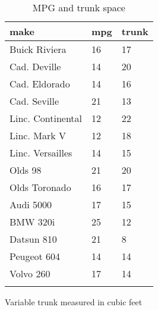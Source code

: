 \documentclass{article}
\begin{document}
\begin{table}[tbp] \centering
{}

\caption{MPG and trunk space}
\begin{tabularx}{\linewidth}{@{}lCC@{}}

\toprule
{make}&{mpg}&{trunk} \tabularnewline
\midrule \addlinespace[\belowrulesep]
Buick Riviera&16&17 \tabularnewline
Cad. Deville&14&20 \tabularnewline
Cad. Eldorado&14&16 \tabularnewline
Cad. Seville&21&13 \tabularnewline
Linc. Continental&12&22 \tabularnewline
Linc. Mark V&12&18 \tabularnewline
Linc. Versailles&14&15 \tabularnewline
Olds 98&21&20 \tabularnewline
Olds Toronado&16&17 \tabularnewline
Audi 5000&17&15 \tabularnewline
BMW 320i&25&12 \tabularnewline
Datsun 810&21&8 \tabularnewline
Peugeot 604&14&14 \tabularnewline
Volvo 260&17&14 \tabularnewline
\bottomrule \addlinespace[\belowrulesep]

\end{tabularx}
\parbox{\linewidth}{\footnotesize Variable trunk measured in cubic feet}
\end{table}
\end{document}
